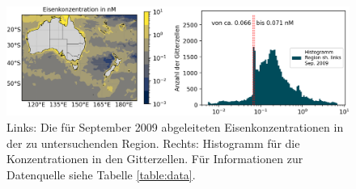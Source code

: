 \documentclass[12pt,a4paper,onecolumn,headheight=30pt]{scrartcl}
\begin{document}
\begin{figure}[htbp]
\includegraphics[width=\textwidth]{bilder/nutrient_iron.png}
\caption{Links: Die für September 2009 abgeleiteten Eisenkonzentrationen in der zu untersuchenden Region. Rechts: Histogramm für die Konzentrationen in den Gitterzellen. Für Informationen zur Datenquelle siehe Tabelle \ref{table:data}.} \label{fig:nutrient_iron}
\end{figure}
\end{document}
